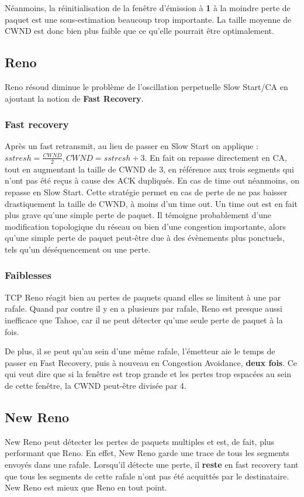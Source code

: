 \documentclass[	DIV=calc,%
							paper=a4,%
							fontsize=11pt,%
							twocolumn]{scrartcl}	 					%
\begin{document}
Néanmoins, la réinitialisation de la fenêtre d'émission à \textbf{1} à la moindre perte de paquet est une sous-estimation beaucoup trop importante. La taille moyenne de CWND est donc bien plus faible que ce qu'elle pourrait être optimalement.


\subsection*{Reno}
Reno résoud diminue le problème de l'oscillation perpetuelle Slow Start/CA en ajoutant la notion de \textbf{Fast Recovery}.

\subsubsection*{Fast recovery}
Après un fast retransmit, au lieu de passer en Slow Start on applique :
$ sstresh=\frac{CWND}{2}, CWND=sstresh+3$. En fait on repasse directement en CA, tout en augmentant la taille de CWND de 3, en référence aux trois segments qui n'ont pas été reçus à cause des ACK dupliqués. En cas de time out néanmoins, on repasse en Slow Start. Cette stratégie permet en cas de perte de ne pas baisser drastiquement la taille de CWND, à moins d'un time out. Un time out est en fait plus grave qu'une simple perte de paquet. Il témoigne probablement d'une modification topologique du réseau ou bien d'une congestion importante, alors qu'une simple perte de paquet peut-être due à des évènements plus ponctuels, tels qu'un déséquencement ou une perte.

\subsubsection*{Faiblesses}
TCP Reno réagit bien au pertes de paquets quand elles se limitent à une par rafale. Quand par contre il y en a plusieurs par rafale, Reno est presque aussi inefficace que Tahoe, car il ne peut détecter qu'une seule perte de paquet à la fois.

De plus, il se peut qu'au sein d'une même rafale, l'émetteur aie le temps de passer en Fast Recovery, puis à nouveau en Congestion Avoidance, \textbf{deux fois}. Ce qui veut dire que si la fenêtre est trop grande et les pertes trop espacées au sein de cette fenêtre, la CWND peut-être divisée par 4.

\subsection*{New Reno}
New Reno peut détecter les pertes de paquets multiples et est, de fait, plus performant que Reno. En effet, New Reno garde une trace de tous les segments envoyés dans une rafale. Lorsqu'il détecte une perte, il \textbf{reste} en fast recovery tant que tous les segments de cette rafale n'ont pas été acquittés par le destinataire. New Reno est mieux que Reno en tout point.
\end{document}
